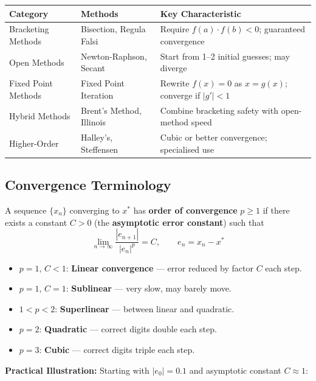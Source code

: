 \documentclass[12pt]{article}
\newcommand{\hcell}[1]{\textbf{\color{white}#1}}
\begin{document}
\begin{center}
{\small
\begin{tabular}{p{3.5cm} p{4.5cm} p{5.5cm}}
\toprule
\rowcolor{primary}
\hcell{Category} & \hcell{Methods} & \hcell{Key Characteristic} \\
\midrule
\rowcolor{amberbg}
Bracketing Methods & Bisection, Regula Falsi & Require $f(a)\cdot f(b)<0$; guaranteed convergence \\
Open Methods & Newton-Raphson, Secant & Start from 1--2 initial guesses; may diverge \\
\rowcolor{amberbg}
Fixed Point Methods & Fixed Point Iteration & Rewrite $f(x)=0$ as $x=g(x)$; converge if $|g'|<1$ \\
Hybrid Methods & Brent's Method, Illinois & Combine bracketing safety with open-method speed \\
\rowcolor{amberbg}
Higher-Order & Halley's, Steffensen & Cubic or better convergence; specialised use \\
\bottomrule
\end{tabular}
}
\end{center}

\bigskip

\subsection*{Convergence Terminology}

\begin{defbox}
A sequence $\{x_n\}$ converging to $x^*$ has \textbf{order of convergence} $p\geq 1$ if there exists a constant $C>0$ (the \textbf{asymptotic error constant}) such that
\[
  \lim_{n\to\infty} \frac{|e_{n+1}|}{|e_n|^p} = C, \qquad e_n = x_n - x^*
\]
\begin{itemize}[noitemsep, topsep=4pt]
  \item $p=1,\,C<1$: \textbf{Linear convergence} — error reduced by factor $C$ each step.
  \item $p=1,\,C=1$: \textbf{Sublinear} — very slow, may barely move.
  \item $1<p<2$: \textbf{Superlinear} — between linear and quadratic.
  \item $p=2$: \textbf{Quadratic} — correct digits double each step.
  \item $p=3$: \textbf{Cubic} — correct digits triple each step.
\end{itemize}
\end{defbox}

\medskip
\textbf{Practical Illustration:} Starting with $|e_0|=0.1$ and asymptotic constant $C\approx 1$:
\end{document}
